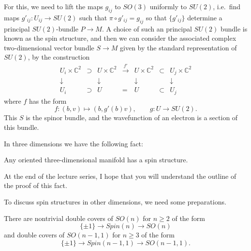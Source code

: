\documentclass[12pt]{article}
\numberwithin{equation}{section}
\numberwithin{figure}{section}
\theoremstyle{remark}
\def\bC{\mathbb{C}}
\def\Spin{\mathit{Spin}}
\begin{document}
For this, we need to lift the maps $g_{ij}$ to $SO(3)$ uniformly to $SU(2)$,
i.e.~find maps $g'_{ij}:U_{ij}\to SU(2)$
such that $\pi\circ g'_{ij}=g_{ij}$ 
so that $\{g'_{ij}\}$ determine a principal $SU(2)$-bundle $P\to M$.
A choice of such an principal $SU(2)$ bundle is known as the spin structure,
and then we can consider the associated complex two-dimensional vector bundle
$S\to M$ 
given by the standard representation of $SU(2)$, by the construction 
\begin{equation}
  \begin{array}{cccccccc}
    U_i \times \bC^2  &\supset& U \times \bC^2  & \xrightarrow{f' } & 
    U \times \bC^2  & \subset & U_j\times \bC^2  \\
    \downarrow & & \downarrow & & \downarrow & & \downarrow \\
    U_i & \supset & U  & = & U  & \subset & U_j
  \end{array}
\end{equation}
where $f $ has the form \begin{equation}
   f : (b,v) \mapsto (b, g'(b) v), \qquad g: U\to SU(2).
\end{equation} 
This $S$ is the spinor bundle,
and the wavefunction of an electron is a section of this bundle.

In three dimensions we have the following fact:
\begin{fact}
  Any oriented three-dimensional manifold has a spin structure.
\end{fact}
At the end of the lecture series, I hope that you will understand the outline 
of the proof of this fact.  

To discuss spin structures in other dimensions, we need some preparations.
\begin{fact}
  There are nontrivial double covers of $SO(n)$ for $n\ge 2$ of the form
  \begin{equation}
  \{\pm1\} \to \Spin(n) \to SO(n)
  \end{equation} and double covers of $SO(n-1,1)$ for $n\ge 3$ of the form
  \begin{equation}
  \{\pm1\} \to \Spin(n-1,1) \to SO(n-1,1).
  \end{equation}
\end{fact}
\end{document}
